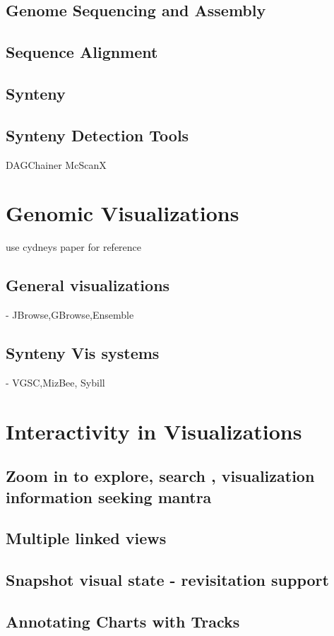 \subsection{Genome Sequencing and Assembly}

\subsection{Sequence Alignment}

\subsection{Synteny}

\subsection{Synteny Detection Tools}
DAGChainer
McScanX



\section{Genomic Visualizations} 

use cydneys paper for reference
\subsection{General visualizations} - JBrowse,GBrowse,Ensemble
\subsection{Synteny Vis systems} - VGSC,MizBee, Sybill

\section{Interactivity in Visualizations}
\subsection{Zoom in to explore, search , visualization information seeking mantra}
\subsection{Multiple linked views}
\subsection{Snapshot visual state - revisitation support}
\subsection{Annotating Charts with Tracks}

